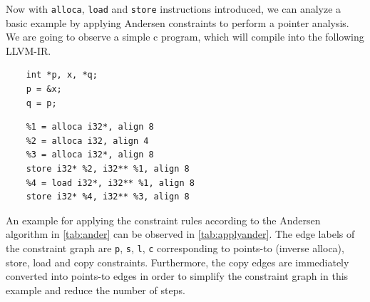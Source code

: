 Now with \verb|alloca|, \verb|load| and \verb|store| instructions introduced, we can analyze a basic example by applying Andersen constraints to perform a pointer analysis.
We are going to observe a simple c program, which will compile into the following LLVM-IR.
\begin{center}
    \begin{minipage}[t]{0.3\textwidth}
        \begin{verbatim}
    int *p, x, *q;
    p = &x;
    q = p;
        \end{verbatim}
    \end{minipage}
    \begin{minipage}[t]{0.6\textwidth}
        \begin{verbatim}
    %1 = alloca i32*, align 8
    %2 = alloca i32, align 4
    %3 = alloca i32*, align 8
    store i32* %2, i32** %1, align 8
    %4 = load i32*, i32** %1, align 8
    store i32* %4, i32** %3, align 8
        \end{verbatim}
    \end{minipage}
\end{center}
An example for applying the constraint rules according to the Andersen algorithm in \autoref{tab:ander} can be observed in \autoref{tab:applyander}.
The edge labels of the constraint graph are \verb|p|, \verb|s|, \verb|l|, \verb|c| corresponding to points-to (inverse alloca), store, load and copy constraints.
Furthermore, the copy edges are immediately converted into points-to edges in order to simplify the constraint graph in this example and reduce the number of steps.
